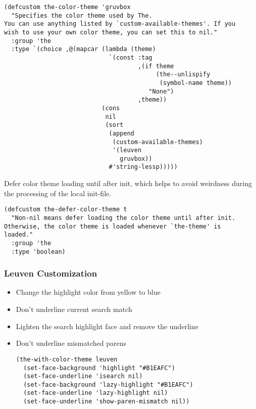 \documentclass[11pt]{article}
\begin{document}
\begin{verbatim}
(defcustom the-color-theme 'gruvbox
  "Specifies the color theme used by The.
You can use anything listed by `custom-available-themes'. If you
wish to use your own color theme, you can set this to nil."
  :group 'the
  :type `(choice ,@(mapcar (lambda (theme)
                             `(const :tag
                                     ,(if theme
                                          (the--unlispify
                                           (symbol-name theme))
                                        "None")
                                     ,theme))
                           (cons
                            nil
                            (sort
                             (append
                              (custom-available-themes)
                              '(leuven
                                gruvbox))
                             #'string-lessp)))))
\end{verbatim}

Defer color theme loading until after init, which helps to avoid
weirdness during the processing of the local init-file.

\begin{verbatim}
(defcustom the-defer-color-theme t
  "Non-nil means defer loading the color theme until after init.
Otherwise, the color theme is loaded whenever `the-theme' is
loaded."
  :group 'the
  :type 'boolean)
\end{verbatim}

\subsubsection{Leuven Customization}
\label{sec:org6cda84b}
\begin{itemize}
\item Change the highlight color from yellow to blue
\item Don't underline current search match
\item Lighten the search highlight face and remove the underline
\item Don't underline mismatched parens

\begin{verbatim}
(the-with-color-theme leuven
  (set-face-background 'highlight "#B1EAFC")
  (set-face-underline 'isearch nil)
  (set-face-background 'lazy-highlight "#B1EAFC")
  (set-face-underline 'lazy-highlight nil)
  (set-face-underline 'show-paren-mismatch nil))
\end{verbatim}
\end{itemize}
\end{document}
